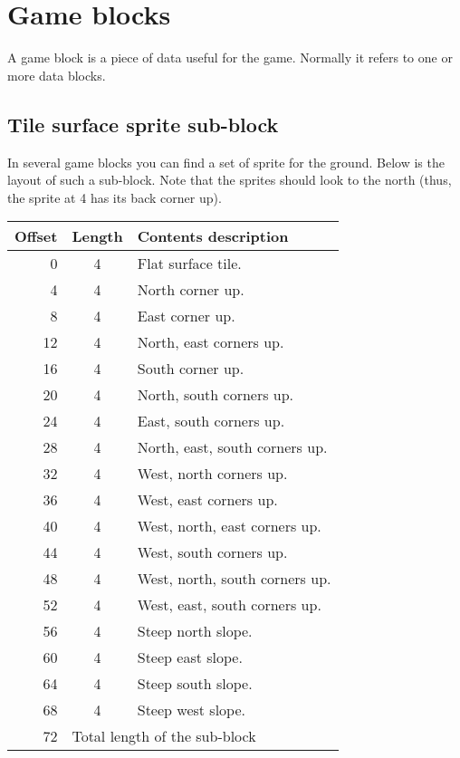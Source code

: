 \documentclass{article}
\begin{document}
\section{Game blocks}
A game block is a piece of data useful for the game. Normally it refers to one
or more data blocks.

\subsection{Tile surface sprite sub-block}
In several game blocks you can find a set of sprite for the ground. Below is
the layout of such a sub-block.
Note that the sprites should look to the north (thus, the sprite at 4 has its
back corner up).

\begin{center}
\begin{tabular}{|r|c|l|} \hline
\textbf{Offset} & \textbf{Length} & \textbf{Contents description} \\ \hline
   0 &  4 & Flat surface tile. \\
   4 &  4 & North corner up. \\
   8 &  4 & East corner up. \\
  12 &  4 & North, east corners up. \\
  16 &  4 & South corner up. \\
  20 &  4 & North, south corners up. \\
  24 &  4 & East, south corners up. \\
  28 &  4 & North, east, south corners up. \\
  32 &  4 & West, north corners up. \\
  36 &  4 & West, east corners up. \\
  40 &  4 & West, north, east corners up. \\
  44 &  4 & West, south corners up. \\
  48 &  4 & West, north, south corners up. \\
  52 &  4 & West, east, south corners up. \\
  56 &  4 & Steep north slope. \\
  60 &  4 & Steep east slope. \\
  64 &  4 & Steep south slope. \\
  68 &  4 & Steep west slope. \\ \hline
  72 & \multicolumn{2}{l|}{Total length of the sub-block} \\ \hline
\end{tabular}
\end{center}
\end{document}
